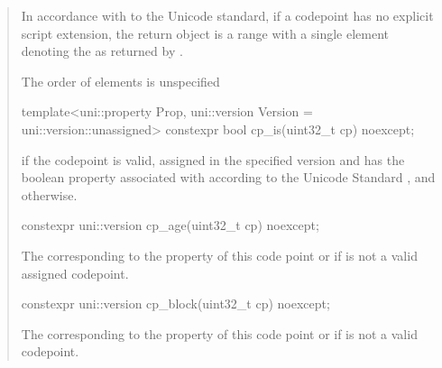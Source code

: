 \documentclass{wg21}
\begin{document}
\begin{quote}
\begin{itemdescr}
\begin{note}
In accordance with to the Unicode standard, if a codepoint has no explicit script extension, the return object is a range with a single element denoting the  as returned by .
\end{note}

\begin{note}
The order of elements is unspecified
\end{note}

\end{itemdescr}

\begin{itemdecl}
template<uni::property Prop, uni::version Version = uni::version::unassigned>
constexpr bool cp_is(uint32_t cp) noexcept;
\end{itemdecl}

\begin{itemdescr}

\mandates {}

\returns {} if the codepoint  is valid, assigned in the specified version and has the boolean property associated with  according to the Unicode Standard ,
and  otherwise.

\end{itemdescr}


\begin{itemdecl}
constexpr uni::version cp_age(uint32_t cp) noexcept;
\end{itemdecl}

\begin{itemdescr}

\returns The  corresponding to the  property of this code point or  if  is not a valid assigned codepoint.

\end{itemdescr}


\begin{itemdecl}
constexpr uni::version cp_block(uint32_t cp) noexcept;
\end{itemdecl}

\begin{itemdescr}

\returns The  corresponding to the  property of this code point or  if  is not a valid codepoint.


\end{itemdescr}
\end{quote}
\end{document}
